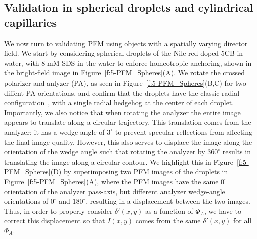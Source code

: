\subsection{Validation in spherical droplets and cylindrical capillaries}
We now turn to validating PFM using objects with a spatially varying director field.
We start by considering spherical droplets of the Nile red-doped 5CB in water, with 8 mM SDS in the water to enforce homeotropic anchoring, shown in the bright-field image in Figure~\ref{f:5-PFM_Spheres}(A).
We rotate the crossed polarizer and anlyzer (PA), as seen in Figure~\ref{f:5-PFM_Spheres}(B,C) for two diffent PA orientations, and confirm that the droplets have the classic radial configuration~\cite{RN177}, with a single radial hedgehog at the center of each droplet.
Importantly, we also notice that when rotating the analyzer the entire image appears to translate along a circular trajectory.
This translation comes from the analyzer; it has a wedge angle of $3^{\circ}$ to prevent specular reflections from affecting the final image quality.
However, this also serves to displace the image along the orientation of the wedge angle such that rotating the analyzer by $360^{\circ}$ results in translating the image along a circular contour.
We highlight this in Figure~\ref{f:5-PFM_Spheres}(D) by superimposing two PFM images of the droplets in Figure~\ref{f:5-PFM_Spheres}(A), where the PFM images have the same $0^{\circ}$ orientation of the analyzer pass-axis, but different analyzer wedge-angle orientations of $0^{\circ}$ and $180^{\circ}$, resulting in a displacement between the two images.
Thus, in order to properly consider $\delta'(x,y)$ as a function of $\Phi_A$, we have to correct this displacement so that $I(x,y)$ comes from the same $\delta'(x,y)$ for all $\Phi_A$.
